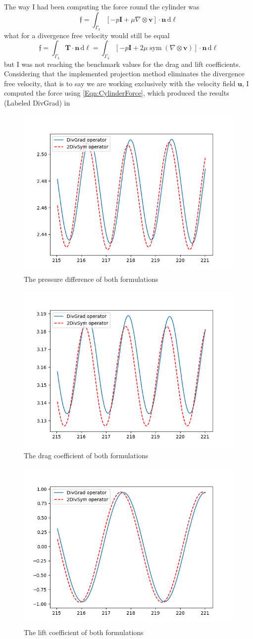 \documentclass[]{scrartcl}
\renewcommand{\d}{\,\mathrm{d}}
\newcommand{\bs}[1]{\boldsymbol{#1}}
\DeclareMathOperator{\Sym}{sym}
\begin{document}
The way I had been computing the force round the cylinder was
\begin{equation*}
	\bs{\mathfrak{f}} =
	\int_{\Gamma_3} [-p\bs{I} + \mu \nabla \otimes \bs{v}] \cdot \bs{n} \d \ell
\end{equation*}
what for a divergence free velocity would still be equal
\begin{equation}\label{Eqn:CylinderForce}
	\bs{\mathfrak{f}} =
	\int_{\Gamma_3} \bs{T} \cdot \bs{n} \d \ell =
	\int_{\Gamma_3} [-p\bs{I} + 2\mu \Sym (\nabla \otimes \bs{v})] \cdot \bs{n} \d \ell	
\end{equation}
but I was not reaching the benchmark values for the drag and lift coefficients. Considering that the implemented projection method eliminates the divergence free velocity, that is to say we are working exclusively with the velocity field $\bs{u}$, I computed the force using \cref{Eqn:CylinderForce}, which produced the results (Labeled DivGrad) in
\begin{figure}
	\centering
	\includegraphics[width=0.5\linewidth]{PressureDifference.png}
	\caption{The pressure difference of both formulations}
	\label{Fig:Pressure}
\end{figure}
\begin{figure}
	\centering
	\includegraphics[width=0.5\linewidth]{DragCoefficient.png}
	\caption{The drag coefficient of both formulations}
	\label{Fig:Drag}
\end{figure}
\begin{figure}
	\centering
	\includegraphics[width=0.5\linewidth]{LiftCoefficient.png}
	\caption{The lift coefficient of both formulations}
	\label{Fig:Lift}
\end{figure}
\end{document}
